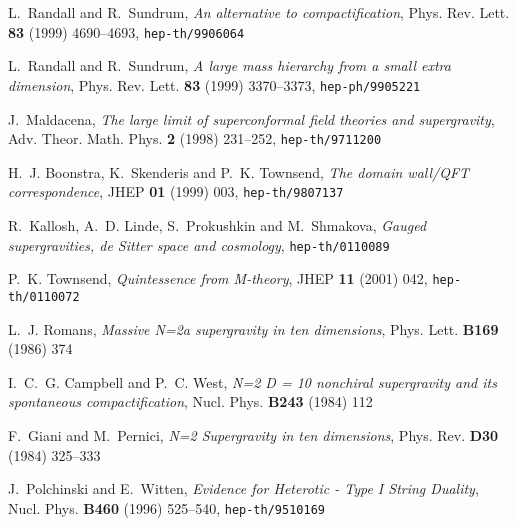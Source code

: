 \documentclass[12pt,a4paper]{article}
\begin{document}
\providecommand{\href}[2]{#2}\begingroup\raggedright\begin{thebibliography}{10}

L.~Randall and R.~Sundrum, \emph{An alternative to compactification}, Phys.
  Rev. Lett. {\bf 83} (1999) 4690--4693,
\href{http://www.arXiv.org/abs/hep-th/9906064}{{\tt hep-th/9906064}}

L.~Randall and R.~Sundrum, \emph{A large mass hierarchy from a small extra
  dimension}, Phys. Rev. Lett. {\bf 83} (1999) 3370--3373,
\href{http://www.arXiv.org/abs/hep-ph/9905221}{{\tt hep-ph/9905221}}

J.~Maldacena, \emph{The large \coordHE{} limit of superconformal field theories and
  supergravity}, Adv. Theor. Math. Phys. {\bf 2} (1998) 231--252,
\href{http://arXiv.org/abs/hep-th/9711200}{{\tt hep-th/9711200}}

H.~J. Boonstra, K.~Skenderis  and P.~K. Townsend, \emph{The domain wall/QFT
  correspondence}, JHEP {\bf 01} (1999) 003,
\href{http://arXiv.org/abs/hep-th/9807137}{{\tt hep-th/9807137}}

R.~Kallosh, A.~D. Linde, S.~Prokushkin  and M.~Shmakova, \emph{Gauged
  supergravities, de Sitter space and cosmology},
\href{http://arXiv.org/abs/hep-th/0110089}{{\tt hep-th/0110089}}

P.~K. Townsend, \emph{Quintessence from M-theory}, JHEP {\bf 11} (2001) 042,
\href{http://arXiv.org/abs/hep-th/0110072}{{\tt hep-th/0110072}}

L.~J. Romans, \emph{Massive N=2a supergravity in ten dimensions}, Phys. Lett.
  {\bf B169} (1986)
374

I.~C.~G. Campbell and P.~C. West, \emph{N=2 D = 10 nonchiral supergravity and
  its spontaneous compactification}, Nucl. Phys. {\bf B243} (1984)
112

F.~Giani and M.~Pernici, \emph{N=2 Supergravity in ten dimensions}, Phys. Rev.
  {\bf D30} (1984)
325--333

J.~Polchinski and E.~Witten, \emph{Evidence for Heterotic - Type I String
  Duality}, Nucl. Phys. {\bf B460} (1996) 525--540,
\href{http://arXiv.org/abs/hep-th/9510169}{{\tt hep-th/9510169}}


\end{thebibliography}
\end{document}
